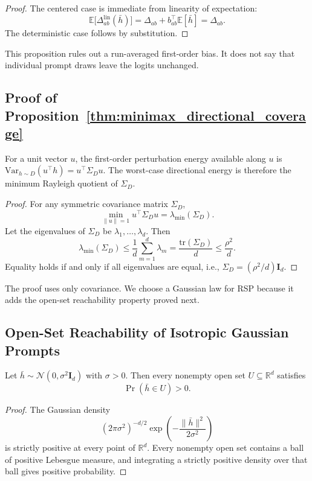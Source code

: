 \begin{proof}
The centered case is immediate from linearity of expectation:
\[
\mathbb{E}\big[\Delta_{ab}^{\mathrm{lin}}(\bar{h})\big]
=
\Delta_{ab} + b_{ab}^\top \mathbb{E}[\bar{h}]
=
\Delta_{ab}.
\]
The deterministic case follows by substitution.
\end{proof}

This proposition rules out a run-averaged first-order bias. It does not say that individual prompt draws leave the logits unchanged.

\subsection{Proof of Proposition~\ref{thm:minimax_directional_coverage}}

For a unit vector $u$, the first-order perturbation energy available along $u$ is $\mathrm{Var}_{h\sim D}(u^\top h)=u^\top \Sigma_D u$. The worst-case directional energy is therefore the minimum Rayleigh quotient of $\Sigma_D$.

\begin{proof}
For any symmetric covariance matrix $\Sigma_D$,
\[
\min_{\|u\|=1} u^\top \Sigma_D u = \lambda_{\min}(\Sigma_D).
\]
Let the eigenvalues of $\Sigma_D$ be $\lambda_1,\dots,\lambda_d$. Then
\[
\lambda_{\min}(\Sigma_D)
\le
\frac{1}{d}\sum_{m=1}^{d}\lambda_m
=
\frac{\mathrm{tr}(\Sigma_D)}{d}
\le
\frac{\rho^2}{d}.
\]
Equality holds if and only if all eigenvalues are equal, i.e., $\Sigma_D = (\rho^2/d)\mathbf{I}_d$.
\end{proof}

The proof uses only covariance. We choose a Gaussian law for RSP because it adds the open-set reachability property proved next.

\subsection{Open-Set Reachability of Isotropic Gaussian Prompts}

\begin{proposition}\label{prop:gaussian_open_support}
Let $\bar h \sim \mathcal{N}(0,\sigma^2\mathbf{I}_d)$ with $\sigma>0$. Then every nonempty open set $U \subseteq \mathbb{R}^d$ satisfies
\[
\Pr(\bar h \in U) > 0.
\]
\end{proposition}

\begin{proof}
The Gaussian density
\[
(2\pi \sigma^2)^{-d/2}\exp\!\left(-\frac{\|\bar h\|^2}{2\sigma^2}\right)
\]
is strictly positive at every point of $\mathbb{R}^d$. Every nonempty open set contains a ball of positive Lebesgue measure, and integrating a strictly positive density over that ball gives positive probability.
\end{proof}

